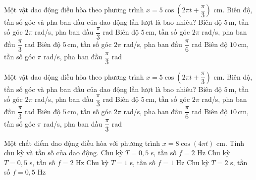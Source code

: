 \begin{ex}
Một vật dao động điều hòa theo phương trình $x=5\cos\left(2\pi t+\dfrac{\pi}{3}\right)$ cm. Biên độ, tần số góc và pha ban đầu của dao động lần lượt là bao nhiêu?
\choice
{Biên độ $5\,\text{m}$, tần số góc $2\pi$ rad/s, pha ban đầu $\dfrac{\pi}{3}$ rad}
{\True Biên độ $5\,\text{cm}$, tần số góc $2\pi$ rad/s, pha ban đầu $\dfrac{\pi}{3}$ rad}
{Biên độ $5\,\text{cm}$, tần số góc $2\pi$ rad/s, pha ban đầu $\dfrac{\pi}{6}$ rad}
{Biên độ $10\,\text{cm}$, tần số góc $\pi$ rad/s, pha ban đầu $\dfrac{\pi}{3}$ rad}
\end{ex}

\begin{ex}
Một vật dao động điều hòa theo phương trình $x=5\cos\left(2\pi t+\dfrac{\pi}{3}\right)$ cm. Biên độ, tần số góc và pha ban đầu của dao động lần lượt là bao nhiêu?
\choice
{Biên độ $5\,\text{m}$, tần số góc $2\pi$ rad/s, pha ban đầu $\dfrac{\pi}{3}$ rad}
{\True Biên độ $5\,\text{cm}$, tần số góc $2\pi$ rad/s, pha ban đầu $\dfrac{\pi}{3}$ rad}
{Biên độ $5\,\text{cm}$, tần số góc $2\pi$ rad/s, pha ban đầu $\dfrac{\pi}{6}$ rad}
{Biên độ $10\,\text{cm}$, tần số góc $\pi$ rad/s, pha ban đầu $\dfrac{\pi}{3}$ rad}
\end{ex}

\begin{ex}
Một chất điểm dao động điều hòa với phương trình $x=8\cos\left(4\pi t\right)$ cm. Tính chu kỳ và tần số của dao động.
\choice
{Chu kỳ $T=0{,}5$ s, tần số $f=2$ Hz}
{\True Chu kỳ $T=0{,}5$ s, tần số $f=2$ Hz}
{Chu kỳ $T=1$ s, tần số $f=1$ Hz}
{Chu kỳ $T=2$ s, tần số $f=0{,}5$ Hz}
\end{ex}

